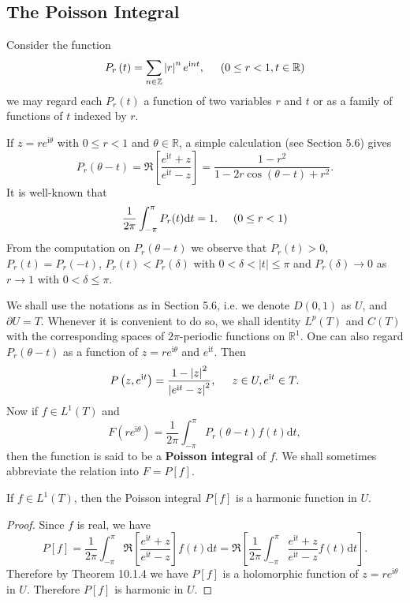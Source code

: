 \subsection{The Poisson Integral}
Consider the function 
$$
P_r\left( t \right) =\sum_{n\in \mathbb{Z}}{\left| r \right|^ne^{\mathrm{i}nt}},\hspace{0.5cm}\left( 0\le r<1,t\in \mathbb{R} \right) 
$$
we may regard each $P_r(t)$ a function of two variables $r$ and $t$ or as a family of functions of $t$ indexed by $r$.\par
If $z=re^{\mathrm{i}\theta}$ with $0\le r<1$ and $\theta\in\mathbb{R}$, a simple calculation (see Section 5.6) gives 
$$
P_r\left( \theta -t \right) =\Re \left[ \frac{e^{\mathrm{i}t}+z}{e^{\mathrm{i}t}-z} \right] =\frac{1-r^2}{1-2r\cos \left( \theta -t \right) +r^2}.
$$
It is well-known that 
$$\frac{1}{2\pi}\int_{-\pi}^\pi P_r(t)\mathrm{d}t=1.\hspace{0.5cm}(0\le r<1)$$
From the computation on $P_r(\theta-t)$ we observe that $P_r(t)>0$, $P_r(t)=P_r(-t)$, $P_r(t)<P_r(\delta)$ with $0<\delta<|t|\le\pi$ and $P_r(\delta)\to 0$ as $r\to 1$ with $0<\delta\le\pi$.\par
We shall use the notations as in Section 5.6, i.e. we denote $D(0,1)$ as $U$, and $\partial U=T$. Whenever it is convenient to do so, we shall identity $L^p(T)$ and $C(T)$ with the corresponding spaces of $2\pi$-periodic functions on $\mathbb{R}^1$. One can also regard $P_r(\theta-t)$ as a function of $z=re^{\mathrm{i}\theta}$ and $e^{\mathrm{i}t}$. Then 
$$
P\left( z,e^{\mathrm{i}t} \right) =\frac{1-\left| z \right|^2}{\left| e^{\mathrm{i}t}-z \right|^2},\hspace{0.5cm}z\in U,e^{\mathrm{i}t}\in T.
$$
Now if $f\in L^1(T)$ and 
$$
F\left( re^{\mathrm{i}\theta} \right) =\frac{1}{2\pi}\int_{-\pi}^{\pi}{P_r\left( \theta -t \right) f\left( t \right) \mathrm{d}t},
$$
then the function is said to be a \textbf{Poisson integral} of $f$. We shall sometimes abbreviate the relation into $F=P[f]$.
\begin{theorem}
If $f\in L^1(T)$, then the Poisson integral $P[f]$ is a harmonic function in $U$.
\end{theorem}
\begin{proof}
Since $f$ is real, we have 
$$
P\left[ f \right] =\frac{1}{2\pi}\int_{-\pi}^{\pi}{\Re \left[ \frac{e^{\mathrm{i}t}+z}{e^{\mathrm{i}t}-z} \right] f\left( t \right) \mathrm{d}t}=\Re \left[ \frac{1}{2\pi}\int_{-\pi}^{\pi}{\frac{e^{\mathrm{i}t}+z}{e^{\mathrm{i}t}-z}f\left( t \right) \mathrm{d}t} \right] .
$$
Therefore by Theorem 10.1.4 we have $P[f]$ is a holomorphic function of $z=re^{\mathrm{i}\theta}$ in $U$. Therefore $P[f]$ is harmonic in $U$.
\end{proof}
